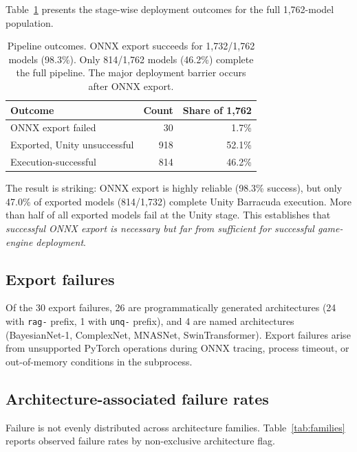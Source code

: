 \documentclass[10pt,twocolumn,letterpaper]{article}
\begin{document}
Table~\ref{tab:success} presents the stage-wise deployment outcomes for the full 1,762-model population.

\begin{table}[t]
\centering\small
\begin{tabular}{lrr}
\toprule
Outcome & Count & Share of 1,762 \\
\midrule
ONNX export failed & 30 & 1.7\% \\
Exported, Unity unsuccessful & 918 & 52.1\% \\
Execution-successful & 814 & 46.2\% \\
\bottomrule
\end{tabular}
\caption{Pipeline outcomes. ONNX export succeeds for 1,732/1,762 models (98.3\%). Only 814/1,762 models (46.2\%) complete the full pipeline. The major deployment barrier occurs after ONNX export.}
\label{tab:success}
\end{table}

The result is striking: ONNX export is highly reliable (98.3\% success), but only 47.0\% of exported models (814/1,732) complete Unity Barracuda execution. More than half of all exported models fail at the Unity stage. This establishes that \emph{successful ONNX export is necessary but far from sufficient for successful game-engine deployment}.

\subsection{Export failures}

Of the 30 export failures, 26 are programmatically generated architectures (24 with \texttt{rag-} prefix, 1 with \texttt{unq-} prefix), and 4 are named architectures (BayesianNet-1, ComplexNet, MNASNet, SwinTransformer). Export failures arise from unsupported PyTorch operations during ONNX tracing, process timeout, or out-of-memory conditions in the subprocess.

\subsection{Architecture-associated failure rates}

Failure is not evenly distributed across architecture families. Table~\ref{tab:families} reports observed failure rates by non-exclusive architecture flag.
\end{document}
